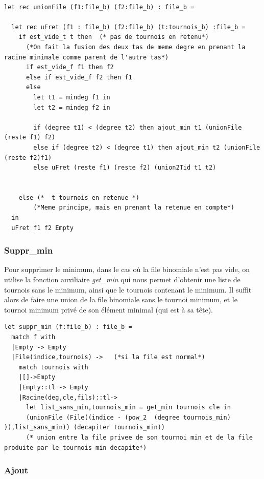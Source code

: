 \documentclass[12pt,a4paper]{article}
\begin{document}
\bigskip \begin{lstlisting}

let rec unionFile (f1:file_b) (f2:file_b) : file_b =

  let rec uFret (f1 : file_b) (f2:file_b) (t:tournois_b) :file_b = 
    if est_vide_t t then  (* pas de tournois en retenu*)
      (*On fait la fusion des deux tas de meme degre en prenant la racine minimale comme parent de l'autre tas*)
      if est_vide_f f1 then f2
      else if est_vide_f f2 then f1 
      else
        let t1 = mindeg f1 in 
        let t2 = mindeg f2 in

        if (degree t1) < (degree t2) then ajout_min t1 (unionFile (reste f1) f2)
        else if (degree t2) < (degree t1) then ajout_min t2 (unionFile (reste f2)f1)
        else uFret (reste f1) (reste f2) (union2Tid t1 t2)


    else (*  t tournois en retenue *)
    	(*Meme principe, mais en prenant la retenue en compte*)
  in
  uFret f1 f2 Empty
\end{lstlisting} \bigskip


\subsubsection{Suppr\_min}

Pour supprimer le minimum, dans le cas où la file binomiale n'est pas vide, on utilise la fonction auxiliaire \textit{get\_min} qui nous permet d'obtenir une liste de tournois sans le minimum, ainsi que le tournois contenant le minimum. Il suffit alors de faire une union de la file binomiale sans le tournoi minimum, et le tournoi minimum privé de son élément minimal (qui est à sa tête).

\bigskip \begin{lstlisting}
let suppr_min (f:file_b) : file_b =
  match f with
  |Empty -> Empty
  |File(indice,tournois) ->   (*si la file est normal*)
    match tournois with
    |[]->Empty
    |Empty::tl -> Empty 
    |Racine(deg,cle,fils)::tl-> 
      let list_sans_min,tournois_min = get_min tournois cle in 
      (unionFile (File((indice - (pow_2  (degree tournois_min) )),list_sans_min)) (decapiter tournois_min))
      (* union entre la file privee de son tournoi min et de la file produite par le tournois min decapite*)
\end{lstlisting} \bigskip
\subsubsection{Ajout}
\end{document}
